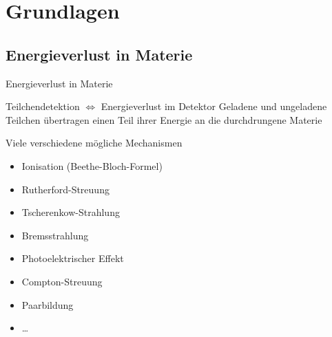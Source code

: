 \documentclass{beamer}
\begin{document}

\section{Grundlagen}


\subsection{Energieverlust in Materie}


\begin{frame}{Energieverlust in Materie}
	\begin{block}{Teilchendetektion $\Leftrightarrow$ Energieverlust im Detektor}
		Geladene und ungeladene Teilchen übertragen einen Teil ihrer Energie an die
		durchdrungene Materie	
	\end{block}
	
	
	\begin{block}{Viele verschiedene mögliche Mechanismen}
		\begin{itemize}
		  \item Ionisation (Beethe-Bloch-Formel)
		  \item Rutherford-Streuung
		  \item Tscherenkow-Strahlung
		  \item Bremsstrahlung
		  \item Photoelektrischer Effekt
		  \item Compton-Streuung
		  \item Paarbildung
		  \item \ldots
		\end{itemize}
	\end{block}
\end{frame}

\end{document}
